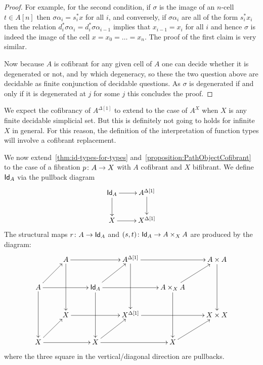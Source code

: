 \documentclass[reqno,10pt,a4paper,oneside,draft]{amsart}
\begin{document}
\begin{proof}
For example, for the second condition, if $\sigma$ is the image of an $n$-cell $t \in A[n]$ then $\sigma \alpha_i = s_i^* x$ for all $i$, and conversely, if $\sigma \alpha_i$ are all of the form $s_i^* x_i$ then the relation $d_i^* \sigma \alpha_i = d_{i}^* \sigma \alpha_{i-1}$ implies that $x_{i-1}=x_i$ for all $i$ and hence $\sigma$ is indeed the image of the cell $x=x_0= \dots = x_n$. The proof of the first claim is very similar.

Now because $A$ is cofibrant for any given cell of $A$ one can decide whether it is degenerated or not, and by which degeneracy, so these the two question above are decidable as finite conjunction of decidable questions. As $\sigma$ is degenerated if and only if it is degenerated at $j$ for some $j$ this concludes the proof.
\end{proof}


\begin{remark}
We expect the cofibrancy of $A^{\Delta[1]}$ to extend to the case of $A^{X}$ when $X$ is any finite decidable simplicial set. But this is definitely not going to holds for infinite $X$ in general. For this reason, the definition of the interpretation of function types will involve a cofibrant replacement.
\end{remark} 


\bigskip


We now extend~\cref{thm:id-types-for-types} and~\cref{proposition:PathObjectCofibrant} 
to the case of a fibration $p \colon A \rightarrow X$ with $A$ cofibrant  and $X$ bifibrant. We define $\mathsf{Id}_A$ 
via the pullback diagram
\[
\xymatrix{
\Id_A \ar[r] \ar[d] & A^{\Delta[1]} \ar[d] \\
X \ar[r] & X^{\Delta[1]} \\
}
\]
The structural maps $r \colon A \rightarrow \mathsf{Id}_A$ and $(s, t) \colon \mathsf{Id}_A \rightarrow A \times_{X} A$ are produced by the diagram:
\[
\xymatrix{
& A \ar[rr] \ar[dd] & & A^{\Delta[1]} \ar[rr] \ar[dd] & & A \times A \ar[dd] \\
A \ar[ur] \ar[rr] \ar[dd] & & \Id_A \ar[ur] \ar[rr] \ar[dd] & & A \times_{X} A \ar[ur] \ar[dd] \\
& X \ar[rr] & & X^{\Delta[1]} \ar[rr] & & X \times X \\
X \ar[ur] \ar[rr] & & X \ar[rr] \ar[ur] & & X \ar[ur] \\ 
}
\]
where the three square in the vertical/diagonal direction are pullbacks.
\end{document}

